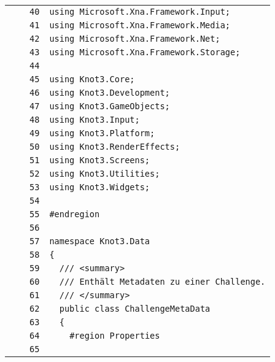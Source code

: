 \documentclass[a4paper,10pt]{article}
\begin{document}
\begin{longtable}[l]{lrrl}
\cellcolor{gray} &  & \verb~40~ & \verb~using Microsoft.Xna.Framework.Input;~\\
\cellcolor{gray} &  & \verb~41~ & \verb~using Microsoft.Xna.Framework.Media;~\\
\cellcolor{gray} &  & \verb~42~ & \verb~using Microsoft.Xna.Framework.Net;~\\
\cellcolor{gray} &  & \verb~43~ & \verb~using Microsoft.Xna.Framework.Storage;~\\
\cellcolor{gray} &  & \verb~44~ & \verb~~\\
\cellcolor{gray} &  & \verb~45~ & \verb~using Knot3.Core;~\\
\cellcolor{gray} &  & \verb~46~ & \verb~using Knot3.Development;~\\
\cellcolor{gray} &  & \verb~47~ & \verb~using Knot3.GameObjects;~\\
\cellcolor{gray} &  & \verb~48~ & \verb~using Knot3.Input;~\\
\cellcolor{gray} &  & \verb~49~ & \verb~using Knot3.Platform;~\\
\cellcolor{gray} &  & \verb~50~ & \verb~using Knot3.RenderEffects;~\\
\cellcolor{gray} &  & \verb~51~ & \verb~using Knot3.Screens;~\\
\cellcolor{gray} &  & \verb~52~ & \verb~using Knot3.Utilities;~\\
\cellcolor{gray} &  & \verb~53~ & \verb~using Knot3.Widgets;~\\
\cellcolor{gray} &  & \verb~54~ & \verb~~\\
\cellcolor{gray} &  & \verb~55~ & \verb~#endregion~\\
\cellcolor{gray} &  & \verb~56~ & \verb~~\\
\cellcolor{gray} &  & \verb~57~ & \verb~namespace Knot3.Data~\\
\cellcolor{gray} &  & \verb~58~ & \verb~{~\\
\cellcolor{gray} &  & \verb~59~ & \verb~  /// <summary>~\\
\cellcolor{gray} &  & \verb~60~ & \verb~  /// Enthält Metadaten zu einer Challenge.~\\
\cellcolor{gray} &  & \verb~61~ & \verb~  /// </summary>~\\
\cellcolor{gray} &  & \verb~62~ & \verb~  public class ChallengeMetaData~\\
\cellcolor{gray} &  & \verb~63~ & \verb~  {~\\
\cellcolor{gray} &  & \verb~64~ & \verb~    #region Properties~\\
\cellcolor{gray} &  & \verb~65~ & \verb~~\\

\end{longtable}
\end{document}
